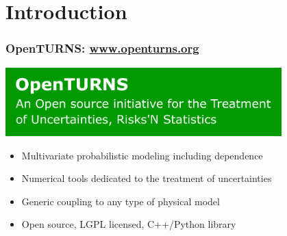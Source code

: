 \documentclass{beamer}
\begin{document}
\section{Introduction}


\begin{frame}
\frametitle{OpenTURNS: \url{www.openturns.org}}


    \begin{center}
    \includegraphics[width=0.8\textwidth]{figures/OT.pdf}
    \end{center}
	
\begin{itemize}
\item Multivariate probabilistic modeling including dependence
\item Numerical tools dedicated to the treatment of uncertainties
\item Generic coupling to any type of physical model
\item Open source, LGPL licensed, C++/Python library
\end{itemize}


\end{frame}

\end{document}
